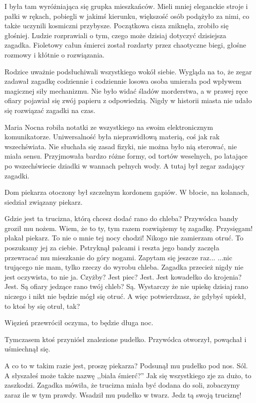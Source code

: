 I była tam wyróżniająca się grupka mieszkańców.
Mieli mniej eleganckie stroje i pałki w rękach, pobiegli w jakimś kierunku, większość osób podążyło za nimi, co także uczynili kosmiczni przybysze.
Początkowa cisza zniknęła, zrobiło się głośniej.
Ludzie rozprawiali o tym, czego może dzisiaj dotyczyć dzisiejsza zagadka.
Fioletowy całun śmierci został rozdarty przez chaotyczne biegi, głośne rozmowy i kłótnie o rozwiązania.

Rodzice uważnie podsłuchiwali wszystkiego wokół siebie.
Wygląda na to, że zegar zadawał zagadkę codziennie i codziennie losowa osoba umierała pod wpływem magicznej siły mechanizmu.
Nie było widać śladów morderstwa, a w prawej ręce ofiary pojawiał się zwój papieru z odpowiedzią.
Nigdy w historii miasta nie udało się rozwiązać zagadki na czas.

Maria Nocna robiła notatki ze wszystkiego na swoim elektronicznym komunikatorze.
Uniwersalność była nieprawidłową materią, coś jak rak wszechświata.
Nie słuchała się zasad fizyki, nie można było nią sterować, nie miała sensu.
Przyjmowała bardzo różne formy, od tortów weselnych, po latające po wszechświecie dziadki w wannach pełnych wody.
A tutaj był zegar zadający zagadki.

Dom piekarza otoczony był szczelnym kordonem gapiów.
W błocie, na kolanach, siedział związany piekarz.
\begin{dialogue}
	\ds{} Gdzie jest ta trucizna, którą chcesz dodać rano do chleba? \dm{} Przywódca bandy groził mu nożem. \dm{} Wiem, że to ty, tym razem rozwiążemy tę zagadkę.
	\ds{} Przysięgam! \dm{} płakał piekarz. \dm{} To nie o mnie tej nocy chodzi! Nikogo nie zamierzam otruć.
	\ds{} To poszukamy jej za ciebie. \dm{} Pstryknął palcami i reszta jego bandy zaczęła przewracać mu mieszkanie do góry nogami. \ds{} Zapytam się jeszcze raz...
	\ds{} ...nic trującego nie mam, tylko rzeczy do wyrobu chleba. Zagadka przecież nigdy nie jest oczywista, to nie ja.
	\ds{} Czyżby? Jest piec? Jest. Jest kowadełko do krojenia? Jest. Są ofiary jedzące rano twój chleb? Są.
	\ds{} Wystarczy że nie upiekę dzisiaj rano niczego i nikt nie będzie mógł się otruć.
	\ds{} A więc potwierdzasz, że gdybyś upiekł, to ktoś by się otruł, tak?
\end{dialogue}
Więzień przewrócił oczyma, to będzie długa noc.

Tymczasem ktoś przyniósł znalezione pudełko.
Przywódca otworzył, powąchał i uśmiechnął się.

\begin{dialogue}
	\ds{} A co to w takim razie jest, proszę piekarza? \dm{} Podsunął mu pudełko pod nos.
	\ds{} Sól.
	\ds{} A słyszałeś może także nazwę ,,biała śmierć?''
	\ds{} Jak się wszystkiego zje za dużo, to zaszkodzi.
	\ds{} Zagadka mówiła, że trucizna miała być dodana do soli, zobaczymy zaraz ile w tym prawdy. \dm{} Wsadził mu pudełko w twarz. \dm{} Jedz tą swoją truciznę!
\end{dialogue}


